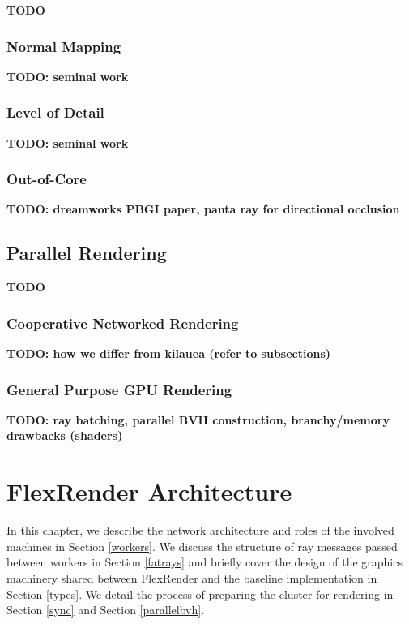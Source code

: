 \documentclass[12pt]{ucthesis}
\begin{document}
\textbf{TODO}

\subsection{Normal Mapping}
\label{normalmaps}

\textbf{TODO: seminal work}

\subsection{Level of Detail}
\label{levelofdetail}

\textbf{TODO: seminal work}

\subsection{Out-of-Core}
\label{outofcore}

\textbf{TODO: dreamworks PBGI paper, panta ray for directional occlusion}

\section{Parallel Rendering}
\label{parallelbg}

\textbf{TODO}

\subsection{Cooperative Networked Rendering}
\label{networked}

\textbf{TODO: how we differ from kilauea (refer to subsections) \cite{kato:2002}}

\subsection{General Purpose GPU Rendering}
\label{gpgpu}

\textbf{TODO: ray batching, parallel BVH construction, branchy/memory drawbacks (shaders)}

\chapter{FlexRender Architecture}
\label{architecture}

In this chapter, we describe the network architecture and roles of the involved
machines in Section \ref{workers}. We discuss the structure of ray messages
passed between workers in Section \ref{fatrays} and briefly cover the design of
the graphics machinery shared between FlexRender and the baseline implementation
in Section \ref{types}. We detail the process of preparing the cluster for
rendering in Section \ref{sync} and Section \ref{parallelbvh}.
\end{document}
